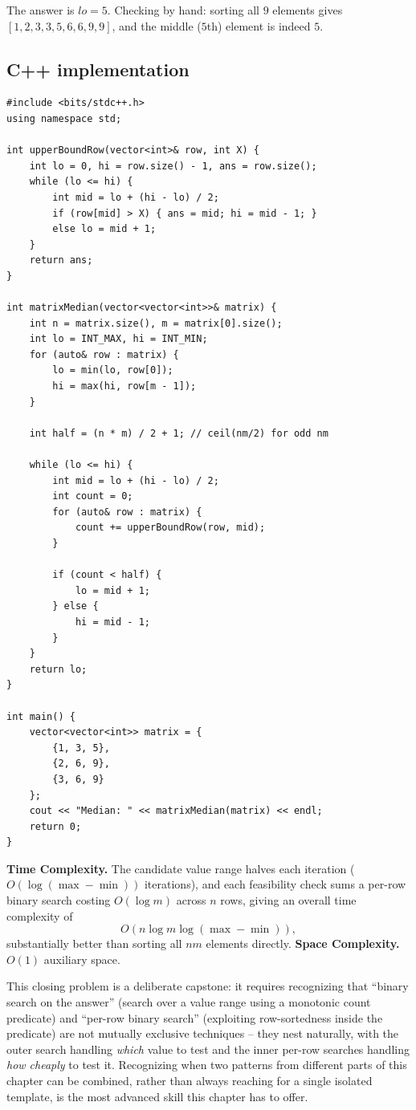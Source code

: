 The answer is $\textit{lo} = 5$. Checking by hand: sorting all $9$
elements gives $[1,2,3,3,5,6,6,9,9]$, and the middle ($5$th) element is
indeed $5$.

\subsection*{C++ implementation}

\begin{lstlisting}
#include <bits/stdc++.h>
using namespace std;

int upperBoundRow(vector<int>& row, int X) {
    int lo = 0, hi = row.size() - 1, ans = row.size();
    while (lo <= hi) {
        int mid = lo + (hi - lo) / 2;
        if (row[mid] > X) { ans = mid; hi = mid - 1; }
        else lo = mid + 1;
    }
    return ans;
}

int matrixMedian(vector<vector<int>>& matrix) {
    int n = matrix.size(), m = matrix[0].size();
    int lo = INT_MAX, hi = INT_MIN;
    for (auto& row : matrix) {
        lo = min(lo, row[0]);
        hi = max(hi, row[m - 1]);
    }

    int half = (n * m) / 2 + 1; // ceil(nm/2) for odd nm

    while (lo <= hi) {
        int mid = lo + (hi - lo) / 2;
        int count = 0;
        for (auto& row : matrix) {
            count += upperBoundRow(row, mid);
        }

        if (count < half) {
            lo = mid + 1;
        } else {
            hi = mid - 1;
        }
    }
    return lo;
}

int main() {
    vector<vector<int>> matrix = {
        {1, 3, 5},
        {2, 6, 9},
        {3, 6, 9}
    };
    cout << "Median: " << matrixMedian(matrix) << endl;
    return 0;
}
\end{lstlisting}

\begin{complexitybox}
\textbf{Time Complexity.} The candidate value range halves each iteration
($O(\log(\max - \min))$ iterations), and each feasibility check sums a
per-row binary search costing $O(\log m)$ across $n$ rows, giving an
overall time complexity of
\[
  O(n \log m \log(\max-\min)),
\]
substantially better than sorting all $nm$ elements directly.
\textbf{Space Complexity.} $O(1)$ auxiliary space.
\end{complexitybox}

\begin{takeawaybox}
This closing problem is a deliberate capstone: it requires recognizing
that ``binary search on the answer'' (search over a value range using a
monotonic count predicate) and ``per-row binary search'' (exploiting
row-sortedness inside the predicate) are not mutually exclusive
techniques -- they nest naturally, with the outer search handling
\emph{which} value to test and the inner per-row searches handling
\emph{how cheaply} to test it. Recognizing when two patterns from
different parts of this chapter can be combined, rather than always
reaching for a single isolated template, is the most advanced skill this
chapter has to offer.
\end{takeawaybox}
